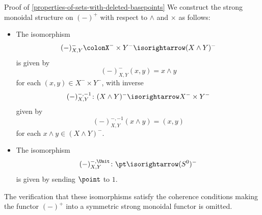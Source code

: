 \begin{Proof}{Proof of \cref{properties-of-sets-with-deleted-basepoints}}
    We construct the strong monoidal structure on $(-)^{+}$ with respect to $\wedge$ and $\times$ as follows:
    \begin{itemize}
        \item{}The isomorphism
            \[
                (-)^{-}_{X,Y}%
                \colon%
                X^{-}\times Y^{-}%
                \isorightarrow
                (X\wedge Y)^{-}
            \]%
            is given by
            \[
                (-)^{-}_{X,Y}(x,y)%
                =%
                x\wedge y
            \]%
            for each $(x,y)\in X^{-}\times Y^{-}$, with inverse
            \[
                (-)^{-,-1}_{X,Y}
                \colon%
                (X\wedge Y)^{-}
                \isorightarrow
                X^{-}\times Y^{-}%
            \]%
            given by
            \[
                (-)^{-,-1}_{X,Y}(x\wedge y)%
                =%
                (x,y)%
            \]%
            for each $x\wedge y\in(X\wedge Y)^{-}$.
        \item{}The isomorphism
            \[
                (-)^{-,\Unit}_{X,Y}%
                \colon%
                \pt%
                \isorightarrow
                (S^{0})^{-}%
            \]%
            is given by sending $\point$ to $1$.
    \end{itemize}
    The verification that these isomorphisms satisfy the coherence conditions making the functor $(-)^{+}$ into a symmetric strong monoidal functor is omitted.
\end{Proof}
\begin{appendices}

\end{appendices}

